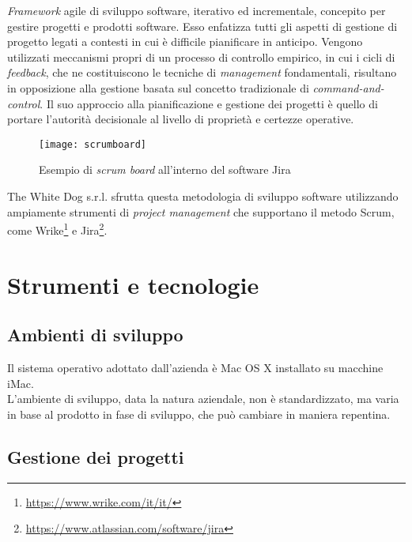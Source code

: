 \textit{Framework} agile di sviluppo software, iterativo ed incrementale, concepito per gestire progetti e prodotti software. Esso enfatizza tutti gli aspetti di gestione di progetto legati a contesti in cui è difficile pianificare in anticipo. Vengono utilizzati meccanismi propri di un processo di controllo empirico, in cui i cicli di \textit{feedback}, che ne costituiscono le tecniche di \textit{management} fondamentali, risultano in opposizione alla gestione basata sul concetto tradizionale di \textit{command-and-control}. Il suo approccio alla pianificazione e gestione dei progetti è quello di portare l'autorità decisionale al livello di proprietà e certezze operative.

\label{Scrum board}
\begin{figure}[ht]
	\begin{center}
		\texttt{[image: scrumboard]}
		\caption{Esempio di \textit{scrum board} all'interno del software Jira}
	\end{center}
\end{figure}
\FloatBarrier

The White Dog s.r.l. sfrutta questa metodologia di sviluppo software utilizzando ampiamente strumenti di \textit{project management} che supportano il metodo Scrum, come Wrike\footnote[4]{\url{https://www.wrike.com/it/it/}} e Jira\footnote[5]{\url{https://www.atlassian.com/software/jira}}.

\section{Strumenti e tecnologie}

\subsection{Ambienti di sviluppo}

Il sistema operativo adottato dall'azienda è Mac OS X installato su macchine iMac. \\
L'ambiente di sviluppo, data la natura aziendale, non è standardizzato, ma varia in base al prodotto in fase di sviluppo, che può cambiare in maniera repentina. 

\subsection{Gestione dei progetti}


